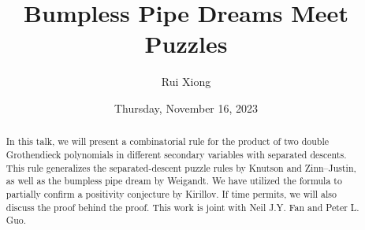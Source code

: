 \documentclass{UAmathtalk}
\author{Rui Xiong}
\title{Bumpless Pipe Dreams Meet Puzzles}
\date{Thursday, November 16, 2023}
\begin{document}
\maketitle

\begin{abstract}
In this talk, we will present a combinatorial rule for the product of two double Grothendieck polynomials in different secondary variables with separated descents. This rule generalizes the separated-descent puzzle rules by Knutson and Zinn--Justin, as well as the bumpless pipe dream by Weigandt. We have utilized the formula to partially confirm a positivity conjecture by Kirillov. If time permits, we will also discuss the proof behind the proof. This work is joint with Neil J.Y. Fan and Peter L. Guo.
\end{abstract}
\end{document}
